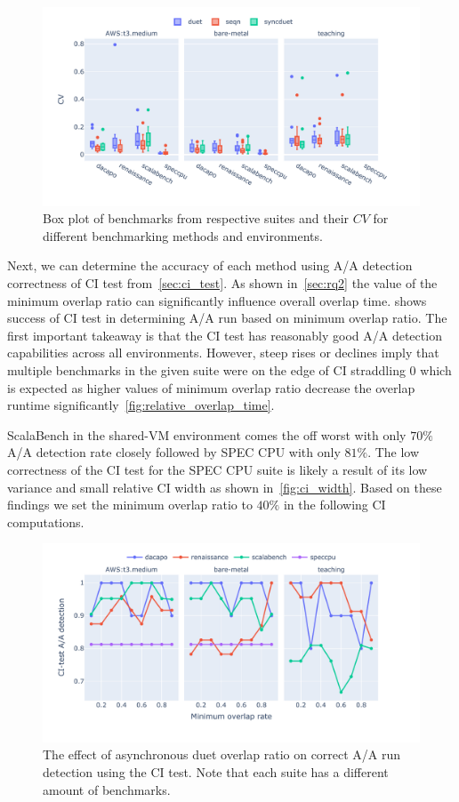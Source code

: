 \begin{figure}
	\centering
	\includegraphics[width=1\linewidth]{./figures/cv.pdf}
	\caption{
		Box plot of benchmarks from respective suites and their $CV$ for different benchmarking methods and environments.
	}
	\label{fig:cv}
\end{figure}

Next, we can determine the accuracy of each method using A/A detection correctness of CI test from~\cref{sec:ci_test}.
As shown in~\cref{sec:rq2} the value of the minimum overlap ratio can significantly influence overall overlap time.
 shows success of CI test in determining A/A run based on minimum overlap ratio.
The first important takeaway is that the CI test has reasonably good A/A detection capabilities across all environments.
However, steep rises or declines imply that multiple benchmarks in the given suite were on the edge of CI straddling $0$ which is expected as higher values of minimum overlap ratio decrease the overlap runtime significantly~\ref{fig:relative_overlap_time}.

ScalaBench in the \mbox{shared-VM} environment comes the off worst with only $70\%$ A/A detection rate closely followed by SPEC CPU with only $81\%$.
The low correctness of the CI test for the SPEC CPU suite is likely a result of its low variance and small relative CI width as shown in~\cref{fig:ci_width}.
Based on these findings we set the minimum overlap ratio to $40\%$ in the following CI computations.

\begin{figure}
	\centering
	\includegraphics[width=1\linewidth]{./figures/citest_aa_match_by_overlap.pdf}
	\caption{
		The effect of asynchronous duet overlap ratio on correct A/A run detection using the CI test.
		Note that each suite has a different amount of benchmarks.
	}
	\label{fig:citest_overlap_aa}
\end{figure}

